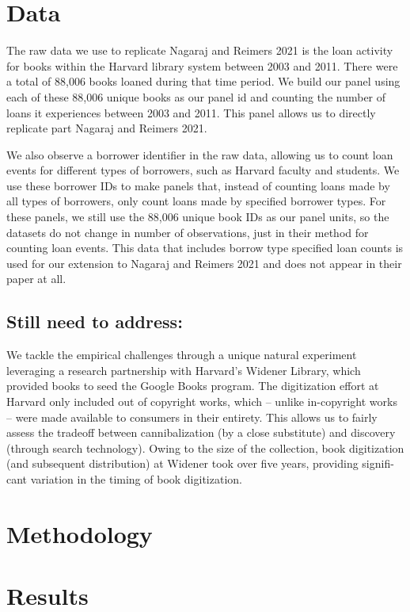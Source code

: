 \documentclass{article}
\begin{document}
\section{Data}
The raw data we use to replicate Nagaraj and Reimers 2021 is the loan activity for books within the Harvard library system between 2003 and 2011. There were a total of 88,006 books loaned during that time period. We build our panel using each of these 88,006 unique books as our panel id and counting the number of loans it experiences between 2003 and 2011. This panel allows us to directly replicate part Nagaraj and Reimers 2021. 

We also observe a borrower identifier in the raw data, allowing us to count loan events for different types of borrowers, such as Harvard faculty and students. We use these borrower IDs to make panels that, instead of counting loans made by all types of borrowers, only count loans made by specified borrower types. For these panels, we still use the 88,006 unique book IDs as our panel units, so the datasets do not change in number of observations, just in their method for counting loan events. This data that includes borrow type specified loan counts is used for our extension to Nagaraj and Reimers 2021 and does not appear in their paper at all. 

\subsection{Still need to address:}
We tackle the empirical challenges through a unique natural experiment leveraging a research partnership with Harvard’s Widener Library, which provided books to seed the Google Books program. The digitization effort at Harvard only included out of copyright works, which – unlike in-copyright works – were made available to consumers in their entirety. This allows us to fairly assess the tradeoff between cannibalization (by a close substitute) and discovery (through search technology). Owing to the size of the collection, book digitization (and subsequent distribution) at Widener took over five years, providing signifi- cant variation in the timing of book digitization.

\section{Methodology}



\section{Results}
\end{document}
